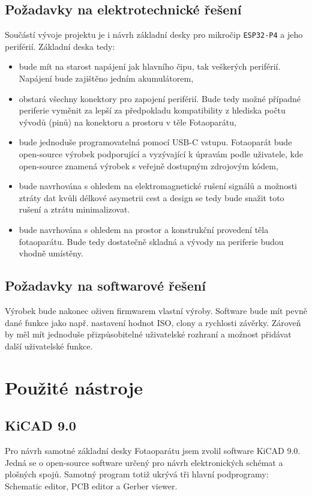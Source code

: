\documentclass[12pt, a4paper, oneside]{report}
\begin{document}
\section{Požadavky na elektrotechnické řešení}
Součástí vývoje projektu je i návrh základní desky pro mikročip \texttt{ESP32-P4} a jeho periférií. Základní deska tedy:
\begin{itemize}
    \item bude mít na starost napájení jak hlavního čipu, tak veškerých periférií. Napájení bude zajištěno jedním akumulátorem,
    \item obstará všechny konektory pro zapojení periférií. Bude tedy možné případné periferie vyměnit za lepší za předpokladu kompatibility z hlediska počtu vývodů (pinů) na konektoru a prostoru v těle Fotaoparátu,
    \item bude jednoduše programovatelná pomocí USB-C vstupu. Fotaoparát bude open-source výrobek podporující a vyzývající k úpravám podle uživatele, kde open-source znamená výrobek s veřejně dostupným zdrojovým kódem,
    \item bude navrhována s ohledem na elektromagnetické rušení signálů a možnosti ztráty dat kvůli délkové asymetrii cest a design se tedy bude snažit toto rušení a ztrátu minimalizovat.
    \item bude navrhována s ohledem na prostor a konstrukční provedení těla fotaoparátu. Bude tedy dostatečně skladná a vývody na periferie budou vhodně umístěny.
\end{itemize}
\section{Požadavky na softwarové řešení}
Výrobek bude nakonec oživen firmwarem vlastní výroby. Software bude mít pevně dané funkce jako např. nastavení hodnot ISO, clony a rychlosti závěrky. Zároveň by měl mít jednoduše přizpůsobitelné uživatelské rozhraní a možnost přidávat další uživatelské funkce.
\chapter{Použité nástroje}
\section{KiCAD 9.0}
Pro návrh samotné základní desky Fotaoparátu jsem zvolil software KiCAD 9.0. Jedná se o open-source software určený pro návrh elektronických schémat a plošných spojů. Samotný program totiž ukrývá tři hlavní podprogramy: Schematic editor, PCB editor a Gerber viewer.
\end{document}
